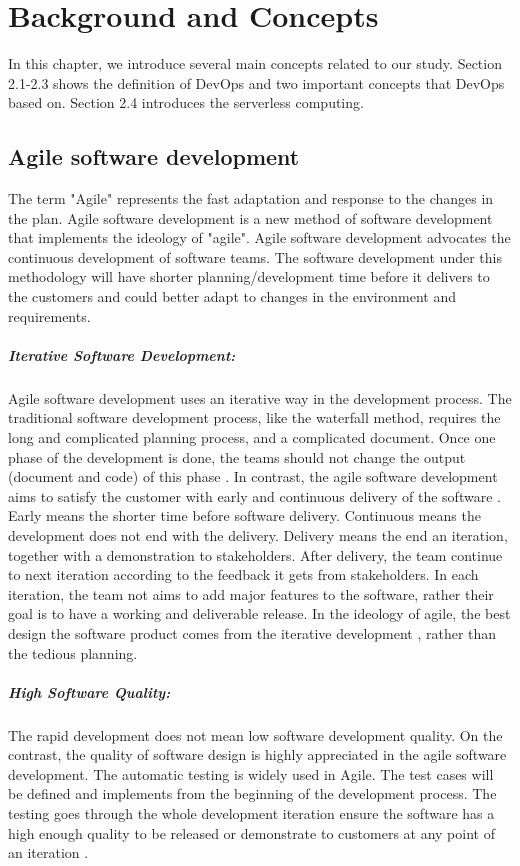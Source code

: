 \chapter{Background and Concepts}
In this chapter, we introduce several main concepts related to our study. Section 2.1-2.3 shows the definition of DevOps and two important concepts that DevOps based on. Section 2.4 introduces the serverless computing.
\section{Agile software development}
\label{agile}
The term "Agile" represents the fast adaptation and response to the changes in the plan\cite{highsmith2002agile}.
Agile software development is a new method of software development that implements the ideology of "agile". Agile software development advocates the continuous development of software teams. The software development under this methodology will have shorter planning/development time before it delivers to the customers and could better adapt to changes in the environment and requirements.
\paragraph{Iterative Software Development:} Agile software development uses an iterative way in the development process. The traditional software development process, like the waterfall method, requires the long and complicated planning process, and a complicated document. Once one phase of the development is done, the teams should not change the output (document and code) of this phase \cite{cusumano1995beyond}. In contrast, the agile software development aims to satisfy the customer with early and continuous delivery of the software \cite{beck2001manifesto}. Early means the shorter time before software delivery. Continuous means the development does not end with the delivery. Delivery means the end an iteration, together with a demonstration to stakeholders. After delivery, the team continue to next iteration according to the feedback it gets from stakeholders. In each iteration, the team not aims to add major features to the software, rather their goal \cite{beck1999embracing} is to have a working and deliverable release. In the ideology of agile, the best design the software product comes from the iterative development \cite{beck2001manifesto}, rather than the tedious planning.
\paragraph{High Software Quality:} The rapid development does not mean low software development quality. On the contrast, the quality of software design is highly appreciated in the agile software development. The automatic testing is widely used in Agile. The test cases will be defined and implements from the beginning of the development process. The testing goes through the whole development iteration ensure the software has a high enough quality to be released or demonstrate to customers at any point of an iteration \cite{Agilesof32:online}.
